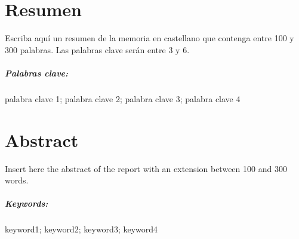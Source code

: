 \chapter*{Resumen}

Escriba aquí un resumen de la memoria en castellano que contenga entre 100 y 300 palabras. Las palabras clave serán entre 3 y 6.

\paragraph{Palabras clave:} palabra clave 1; palabra clave 2; palabra clave 3; palabra clave 4 









\chapter*{Abstract}

Insert here the abstract of the report with an extension between 100 and 300 words. 

\paragraph{Keywords:} keyword1; keyword2; keyword3; keyword4
